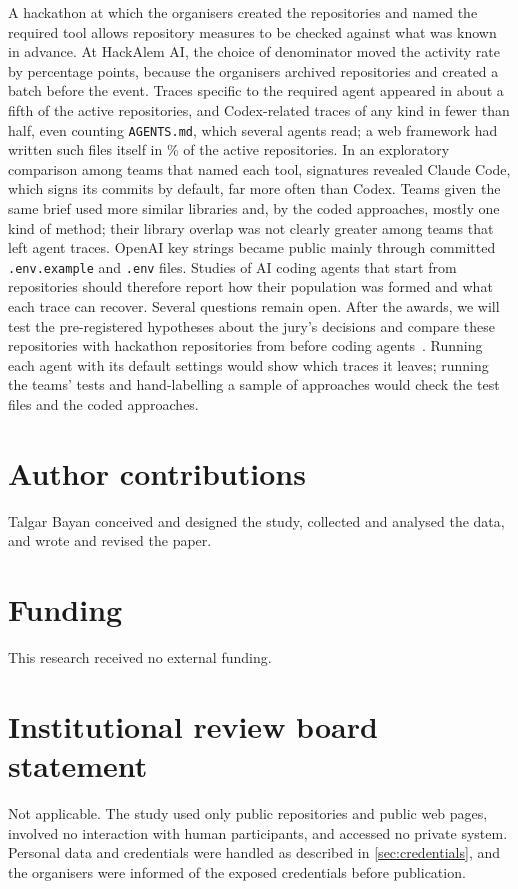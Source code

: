 \documentclass{article}
\begin{document}
A hackathon at which the organisers created the repositories and named the required tool allows repository measures to be checked against what was known in advance. At HackAlem AI, the choice of denominator moved the activity rate by \NRqOneActiveGapPp{} percentage points, because the organisers archived repositories and created a batch before the event. Traces specific to the required agent appeared in about a fifth of the active repositories, and Codex-related traces of any kind in fewer than half, even counting \texttt{AGENTS.md}, which several agents read; a web framework had written such files itself in \NRqTwoTracesContextExcludedNextjsPct\% of the active repositories. In an exploratory comparison among teams that named each tool, signatures revealed Claude Code, which signs its commits by default, far more often than Codex. Teams given the same brief used more similar libraries and, by the coded approaches, mostly one kind of method; their library overlap was not clearly greater among teams that left agent traces. OpenAI key strings became public mainly through committed \texttt{.env.example} and \texttt{.env} files. Studies of AI coding agents that start from repositories should therefore report how their population was formed and what each trace can recover. Several questions remain open. After the awards, we will test the pre-registered hypotheses about the jury's decisions and compare these repositories with hackathon repositories from before coding agents~\cite{halmans2026hackrep}. Running each agent with its default settings would show which traces it leaves; running the teams' tests and hand-labelling a sample of approaches would check the test files and the coded approaches.

\section*{Author contributions}
Talgar Bayan conceived and designed the study, collected and analysed the data, and wrote and revised the paper.

\section*{Funding}
This research received no external funding.

\section*{Institutional review board statement}
Not applicable. The study used only public repositories and public web pages, involved no interaction with human participants, and accessed no private system. Personal data and credentials were handled as described in \cref{sec:credentials}, and the organisers were informed of the exposed credentials before publication.
\end{document}
